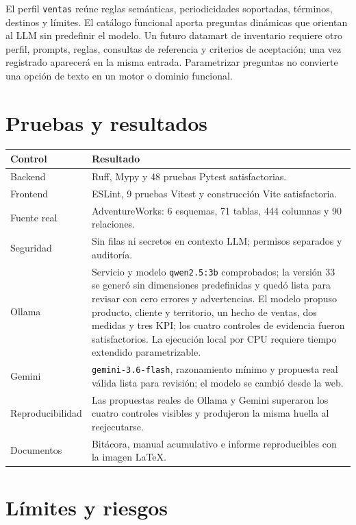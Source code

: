 \documentclass[11pt,letterpaper]{article}
\newcommand{\file}[1]{\texttt{#1}}
\begin{document}
El perfil \file{ventas} reúne reglas semánticas, periodicidades soportadas, términos, destinos y límites. El catálogo funcional aporta preguntas dinámicas que orientan al LLM sin predefinir el modelo. Un futuro datamart de inventario requiere otro perfil, prompts, reglas, consultas de referencia y criterios de aceptación; una vez registrado aparecerá en la misma entrada. Parametrizar preguntas no convierte una opción de texto en un motor o dominio funcional.

\section{Pruebas y resultados}

\begin{tabularx}{\textwidth}{@{}p{}X@{}}
  \toprule
  Control & Resultado \\
  \midrule
  Backend & Ruff, Mypy y 48 pruebas Pytest satisfactorias. \\
  Frontend & ESLint, 9 pruebas Vitest y construcción Vite satisfactoria. \\
  Fuente real & AdventureWorks: 6 esquemas, 71 tablas, 444 columnas y 90 relaciones. \\
  Seguridad & Sin filas ni secretos en contexto LLM; permisos separados y auditoría. \\
  Ollama & Servicio y modelo \file{qwen2.5:3b} comprobados; la versión 33 se generó sin dimensiones predefinidas y quedó lista para revisar con cero errores y advertencias. El modelo propuso producto, cliente y territorio, un hecho de ventas, dos medidas y tres KPI; los cuatro controles de evidencia fueron satisfactorios. La ejecución local por CPU requiere tiempo extendido parametrizable. \\
  Gemini & \file{gemini-3.6-flash}, razonamiento mínimo y propuesta real válida lista para revisión; el modelo se cambió desde la web. \\
  Reproducibilidad & Las propuestas reales de Ollama y Gemini superaron los cuatro controles visibles y produjeron la misma huella al reejecutarse. \\
  Documentos & Bitácora, manual acumulativo e informe reproducibles con la imagen LaTeX. \\
  \bottomrule
\end{tabularx}

\section{Límites y riesgos}
\end{document}
